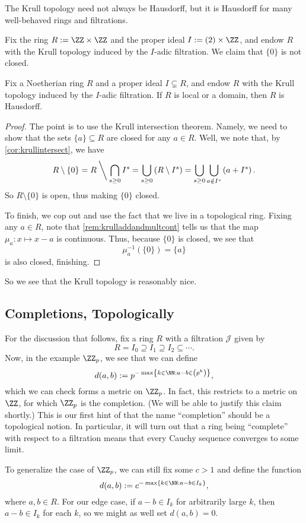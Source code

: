 The Krull topology need not always be Hausdorff, but it is Hausdorff for many well-behaved rings and filtrations.
\begin{example}
	Fix the ring $R:=\ZZ\times\ZZ$ and the proper ideal $I:=(2)\times\ZZ$, and endow $R$ with the Krull topology induced by the $I$-adic filtration. We claim that $\{0\}$ is not closed. 
\end{example}
\begin{lemma}
	Fix a Noetherian ring $R$ and a proper ideal $I\subsetneq R$, and endow $R$ with the Krull topology induced by the $I$-adic filtration. If $R$ is local or a domain, then $R$ is Hausdorff.
\end{lemma}
\begin{proof}
	The point is to use the Krull intersection theorem. Namely, we need to show that the sets $\{a\}\subseteq R$ are closed for any $a\in R$. Well, we note that, by \autoref{cor:krullintersect}, we have
	\[R\setminus\{0\}=R\mathbin{\bigg\backslash}\bigcap_{s\ge0}I^s=\bigcup_{s\ge0}\left(R\setminus I^s\right)=\bigcup_{s\ge0}\bigcup_{a\notin I^s}\left(a+I^s\right).\]
	So $R\setminus\{0\}$ is open, thus making $\{0\}$ closed.

	To finish, we cop out and use the fact that we live in a topological ring. Fixing any $a\in R$, note that \autoref{rem:krulladdandmultcont} tells us that the map $\mu_a:x\mapsto x-a$ is continuous. Thus, because $\{0\}$ is closed, we see that
	\[\mu_a^{-1}(\{0\})=\{a\}\]
	is also closed, finishing.
\end{proof}
So we see that the Krull topology is reasonably nice.

\subsection{Completions, Topologically}
For the discussion that follows, fix a ring $R$ with a filtration $\mathcal J$ given by
\[R=I_0\supseteq I_1\supseteq I_2\subseteq\cdots.\]
Now, in the example $\ZZ_p$, we see that we can define
\[d(a,b):=p^{-\max\left\{k\in\NN:a-b\in\left(p^k\right)\right\}},\]
which we can check forms a metric on $\ZZ_p$. In fact, this restricts to a metric on $\ZZ$, for which $\ZZ_p$ is the completion. (We will be able to justify this claim shortly.) This is our first hint of that the name ``completion'' should be a topological notion. In particular, it will turn out that a ring being ``complete'' with respect to a filtration means that every Cauchy sequence converges to some limit.

To generalize the case of $\ZZ_p$, we can still fix some $c>1$ and define the function
\[d(a,b):=c^{-\max\{k\in\NN:a-b\in I_k\}},\]
where $a,b\in R$. For our edge case, if $a-b\in I_k$ for arbitrarily large $k$, then $a-b\in I_k$ for each $k$, so we might as well set $d(a,b)=0$.

